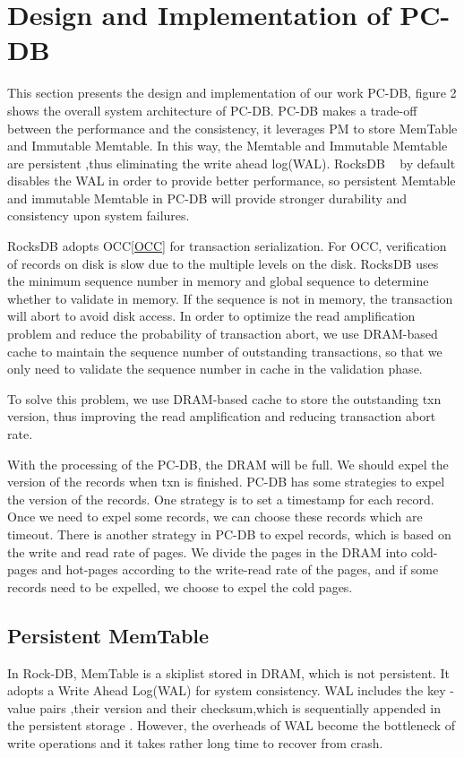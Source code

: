 \section{Design and Implementation of PC-DB}
This section presents the design and implementation of our work PC-DB, figure 2 shows the overall system architecture of PC-DB. 
PC-DB makes a trade-off between the performance and the consistency, it leverages PM to  store MemTable and Immutable Memtable. 
In this way, the Memtable and Immutable Memtable are persistent ,thus eliminating the write ahead log(WAL). 
RocksDB ~\cite{RocksDB} by default disables the WAL in order to provide better performance, 
so persistent Memtable and immutable Memtable in PC-DB will provide stronger durability and consistency upon system failures.

RocksDB adopts OCC\ref{OCC} for transaction serialization.
For OCC, verification of records on disk is slow due to the multiple levels on the disk. 
RocksDB uses the minimum sequence number in memory and global sequence to determine whether to validate in memory. 
If the sequence is not in memory, the transaction will abort to avoid disk access. 
In order to optimize the read amplification problem and reduce the probability of transaction abort, 
we use DRAM-based cache to maintain the sequence number of outstanding transactions, 
so that we only need to validate the sequence number in cache in the validation phase.

 To solve this problem, we use DRAM-based cache to store the outstanding txn version, 
 thus improving the read amplification and reducing transaction abort rate.

With the processing of the PC-DB, the DRAM will be full. We should expel the version of the records when txn is finished. PC-DB has some strategies to expel the version of the records. One strategy is to set a timestamp for each record. Once we need to expel some records, we can choose these records which are timeout. There is another strategy in PC-DB to expel records, which is based on the write and read rate of pages. We divide the pages in the DRAM into cold-pages and hot-pages according to the write-read rate of the pages, and if some records need to be expelled, we choose to expel the cold pages.

\subsection{Persistent MemTable}
In Rock-DB, MemTable is a skiplist stored in DRAM, which is not persistent. It adopts a Write Ahead Log(WAL) for system consistency. WAL includes the key -value pairs ,their version and their checksum,which is sequentially appended in the persistent storage . 
However, the overheads of WAL become the bottleneck of write operations and it takes rather long time to recover from crash. 

